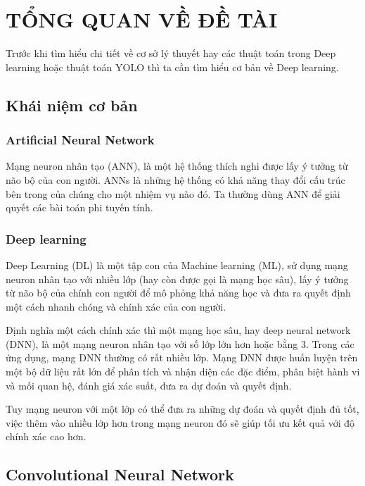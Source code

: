 \clearpage
{}

\setcounter{chapter}{0}
\chapter[{TỔNG QUAN VỀ ĐỀ TÀI}]{TỔNG QUAN VỀ ĐỀ TÀI}

Trước khi tìm hiểu chi tiết về cơ sở lý thuyết hay các thuật toán trong Deep learning hoặc thuật toán YOLO thì ta cần tìm hiểu cơ bản về Deep learning.   

\section{Khái niệm cơ bản}

\subsection{Artificial Neural Network}
Mạng neuron nhân tạo (ANN), là một hệ thống thích nghi được lấy ý tưởng từ não bộ của con người. ANNs là những hệ thống có khả năng thay đổi cấu trúc bên trong của chúng cho một nhiệm vụ nào đó. Ta thường dùng ANN để giải quyết các bài toán phi tuyến tính. \cite{article}

\subsection{Deep learning}
Deep Learning (DL) là một tập con của Machine learning (ML), sử dụng mạng neuron nhân tạo với nhiều lớp (hay còn được gọi là mạng học sâu), lấy ý tưởng từ não bộ của chính con người để mô phỏng khả năng học và đưa ra quyết định một cách nhanh chóng và chính xác của con người. 

Định nghĩa một cách chính xác thì một mạng học sâu, hay deep neural network (DNN), là một mạng neuron nhân tạo với số lớp lớn hơn hoặc bằng 3. Trong các ứng dụng, mạng DNN thường có rất nhiều lớp. Mạng DNN được huấn luyện trên một bộ dữ liệu rất lớn để phân tích và nhận diện các đặc điểm, phân biệt hành vi và mối quan hệ, đánh giá xác suất, đưa ra dự đoán và quyết định. 

Tuy mạng neuron với một lớp có thể đưa ra những dự đoán và quyết định đủ tốt, việc thêm vào nhiều lớp hơn trong mạng neuron đó sẽ giúp tối ưu kết quả với độ chính xác cao hơn.

\section{Convolutional Neural Network}

